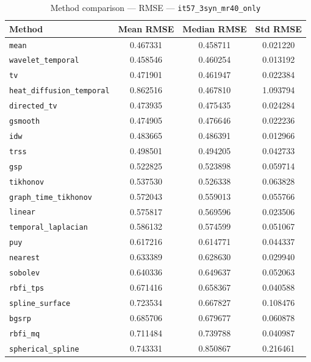 \begin{table}[ht]
\centering
\caption{Method comparison — RMSE — \texttt{it57_3syn_mr40_only}}
\label{tab:rmse_it57_3syn_mr40_only}
\begin{tabular}{lccc}
\hline
Method & Mean RMSE & Median RMSE & Std RMSE \\
\hline
\texttt{mean} & 0.467331 & 0.458711 & 0.021220 \\
\texttt{wavelet_temporal} & 0.458546 & 0.460254 & 0.013192 \\
\texttt{tv} & 0.471901 & 0.461947 & 0.022384 \\
\texttt{heat_diffusion_temporal} & 0.862516 & 0.467810 & 1.093794 \\
\texttt{directed_tv} & 0.473935 & 0.475435 & 0.024284 \\
\texttt{gsmooth} & 0.474905 & 0.476646 & 0.022236 \\
\texttt{idw} & 0.483665 & 0.486391 & 0.012966 \\
\texttt{trss} & 0.498501 & 0.494205 & 0.042733 \\
\texttt{gsp} & 0.522825 & 0.523898 & 0.059714 \\
\texttt{tikhonov} & 0.537530 & 0.526338 & 0.063828 \\
\texttt{graph_time_tikhonov} & 0.572043 & 0.559013 & 0.055766 \\
\texttt{linear} & 0.575817 & 0.569596 & 0.023506 \\
\texttt{temporal_laplacian} & 0.586132 & 0.574599 & 0.051067 \\
\texttt{puy} & 0.617216 & 0.614771 & 0.044337 \\
\texttt{nearest} & 0.633389 & 0.628630 & 0.029940 \\
\texttt{sobolev} & 0.640336 & 0.649637 & 0.052063 \\
\texttt{rbfi_tps} & 0.671416 & 0.658367 & 0.040588 \\
\texttt{spline_surface} & 0.723534 & 0.667827 & 0.108476 \\
\texttt{bgsrp} & 0.685706 & 0.679677 & 0.060878 \\
\texttt{rbfi_mq} & 0.711484 & 0.739788 & 0.040987 \\
\texttt{spherical_spline} & 0.743331 & 0.850867 & 0.216461 \\
\hline
\end{tabular}
\end{table}
